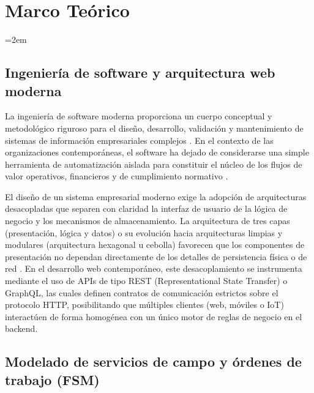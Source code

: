 
\chapter{Marco Teórico}
\label{ch:marco-teorico}

\setlength{\parindent}{0pt}
\setlength{\parskip}{6pt}
\sloppy
\emergencystretch=2em
\raggedbottom
\section{Ingeniería de software y arquitectura web moderna}

La ingeniería de software moderna proporciona un cuerpo conceptual y metodológico riguroso para el diseño, desarrollo, validación y mantenimiento de sistemas de información empresariales complejos \cite{sommerville2016}. En el contexto de las organizaciones contemporáneas, el software ha dejado de considerarse una simple herramienta de automatización aislada para constituir el núcleo de los flujos de valor operativos, financieros y de cumplimiento normativo \cite{pressman2020}. 

El diseño de un sistema empresarial moderno exige la adopción de arquitecturas desacopladas que separen con claridad la interfaz de usuario de la lógica de negocio y los mecanismos de almacenamiento. La arquitectura de tres capas (presentación, lógica y datos) o su evolución hacia arquitecturas limpias y modulares (arquitectura hexagonal u cebolla) favorecen que los componentes de presentación no dependan directamente de los detalles de persistencia física o de red \cite{bass2021}. En el desarrollo web contemporáneo, este desacoplamiento se instrumenta mediante el uso de APIs de tipo REST (Representational State Transfer) o GraphQL, las cuales definen contratos de comunicación estrictos sobre el protocolo HTTP, posibilitando que múltiples clientes (web, móviles o IoT) interactúen de forma homogénea con un único motor de reglas de negocio en el backend.

\section{Modelado de servicios de campo y órdenes de trabajo (FSM)}

